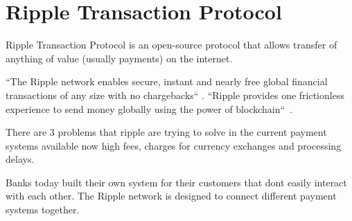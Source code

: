 \section{Ripple Transaction Protocol}

Ripple Transaction Protocol is an open-source 
protocol that allows
transfer of anything of value 
(usually payments) on the internet.

``The Ripple network enables secure, instant 
and nearly free global financial transactions 
of any size with no chargebacks``
\cite{hid-sp18-506-RippleNetwork}.
``Ripple provides one frictionless
experience to send money globally using the power of
blockchain``~\cite{hid-sp18-506-GlobalPayment}.


There are 3 problems that ripple are trying 
to solve in the current
payment systems available now
high fees, charges for currency
exchanges and processing delays.

Banks today built their own system 
for their customers that dont
easily interact with each other. 
The Ripple network is designed to
connect different payment systems together.